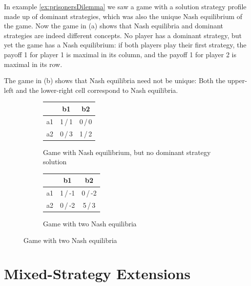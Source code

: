 \documentclass[a4paper]{scrreprt}
\begin{document}
    \begin{ex}
        In example \ref{ex:prisonersDilemma} we saw a game with a solution strategy profile made up of dominant strategies, which was also the unique Nash equilibrium of the game.
        Now the game in (a)
        shows that Nash equilibria and dominant strategies are indeed different concepts. No player has a dominant strategy, but yet the game has a Nash equilibrium: if both players play their first strategy, the payoff 1 for player 1 is maximal in its column, and the payoff 1 for player 2 is maximal in its row.
        
        The game in (b)
        shows that Nash equilibria need not be unique: Both the upper-left and the lower-right cell correspond to Nash equilibria.
        
        \begin{figure}[h]
            \centering
            \begin{subfigure}[t]{0.49\textwidth}
                \centering
                \begin{tabular}{c|c|c|}
                	   &   b1    &   b2    \\ \hline
                	a1 & 1\,/\,1 & 0\,/\,0 \\ \hline
                	a2 & 0\,/\,3 & 1\,/\,2 \\ \hline
                \end{tabular}
                \caption{Game with Nash equilibrium, but no dominant strategy solution}
                \label{fig:nashEquilibriumNoDominantStrategy}
            \end{subfigure}
            \begin{subfigure}[t]{0.49\textwidth}
                \centering
                \begin{tabular}{c|c|c|}
                    &   b1    &   b2    \\ \hline
                    a1 & 1\,/\,-1 & 0\,/\,-2 \\ \hline
                    a2 & 0\,/\,-2 & 5\,/\,3 \\ \hline
                \end{tabular}
                \caption{Game with two Nash equilibria}   
                \label{fig:twoNashEquilibria}
            \end{subfigure}
        \end{figure}
    \end{ex}
    
    \section{Mixed-Strategy Extensions}
    
\end{document}
